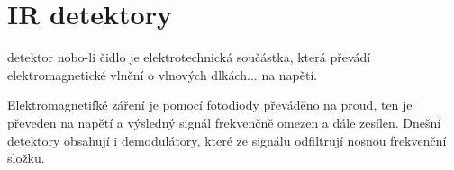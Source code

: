 \section{IR detektory}
 detektor nobo-li čidlo je elektrotechnická součástka, která převádí elektromagnetické vlnění o vlnových dlkách... na napětí.

Elektromagnetifké záření je pomocí fotodiody převáděno na proud, ten je převeden na napětí a výsledný signál frekvenčně omezen a dále zesílen. Dnešní detektory obsahují i demodulátory, které ze signálu odfiltrují nosnou frekvenční složku.
